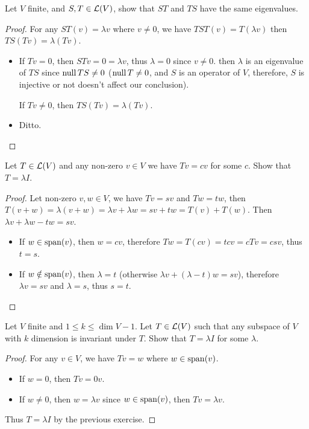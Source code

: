 \documentclass[../main.tex]{subfiles}
\begin{document}
\begin{exercise}
  Let $V$ finite, and $S, T \in \mathcal{L}(V)$, show that $ST$ and $TS$ have the same
  eigenvalues.
\end{exercise}
\begin{proof}
  For any $ST(v) = \lambda v$ where $v \neq 0$, we have $TST(v) = T(\lambda v)$
  then $TS(Tv) = \lambda (Tv)$.
  \begin{itemize}
    \item If $Tv = 0$, then $STv = 0 = \lambda v$, thus $\lambda = 0$ since $v \neq 0$.
          then $\lambda$ is an eigenvalue of $TS$ since $\operatorname{null} TS \neq 0$
          ($\operatorname{null} T \neq 0$, and $S$ is an operator of $V$, therefore, 
          $S$ is injective or not doesn't affect our conclusion).

          If $Tv \neq 0$, then $TS(Tv) = \lambda (Tv)$.
    \item Ditto.
  \end{itemize}
\end{proof}

\setcounter{exercise}{25}
\begin{exercise}
  Let $T \in \mathcal{L}(V)$ and any non-zero $v \in V$ we have $Tv = cv$ for some $c$.
  Show that $T = \lambda I$.
\end{exercise}
\begin{proof}
  Let non-zero $v, w \in V$, we have $Tv = sv$ and $Tw = tw$,
  then $T(v + w) = \lambda (v + w) = \lambda v + \lambda w = sv + tw = T(v) + T(w)$.
  Then $\lambda v + \lambda w - tw = sv$.
  \begin{itemize}
    \item If $w \in \operatorname{span}(v)$, then $w = cv$, therefore $Tw = T(cv) = tcv = cTv = csv$,
          thus $t = s$.
    \item If $w \notin \operatorname{span}(v)$, then $\lambda = t$ (otherwise $\lambda v + (\lambda - t)w = sv$),
          therefore $\lambda v = sv$ and $\lambda = s$, thus $s = t$.
  \end{itemize}
\end{proof}

\begin{exercise}
  Let $V$ finite and $1 \le k \le \dim V - 1$. Let $T \in \mathcal{L}(V)$
  such that any subspace of $V$ with $k$ dimension is invariant under $T$.
  Show that $T = \lambda I$ for some $\lambda$.
\end{exercise}
\begin{proof}
  For any $v \in V$, we have $Tv = w$ where $w \in \operatorname{span}(v)$.
  \begin{itemize}
    \item If $w = 0$, then $Tv = 0v$.
    \item If $w \neq 0$, then $w = \lambda v$ since $w \in \operatorname{span}(v)$,
          then $Tv = \lambda v$.
  \end{itemize}
  Thus $T = \lambda I$ by the previous exercise.
\end{proof}
\end{document}
